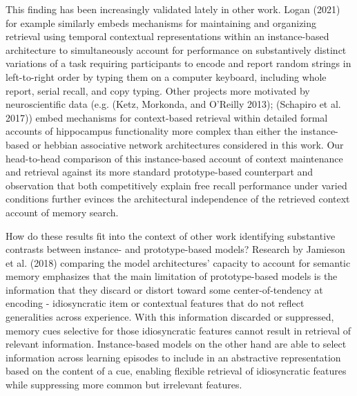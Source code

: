\documentclass[
  letterpaper,
  DIV=11]{article}
\begin{document}
This finding has been increasingly validated lately in other work. Logan
(2021) for example similarly embeds mechanisms for maintaining and
organizing retrieval using temporal contextual representations within an
instance-based architecture to simultaneously account for performance on
substantively distinct variations of a task requiring participants to
encode and report random strings in left-to-right order by typing them
on a computer keyboard, including whole report, serial recall, and copy
typing. Other projects more motivated by neuroscientific data (e.g.
(Ketz, Morkonda, and O'Reilly 2013); (Schapiro et al. 2017)) embed
mechanisms for context-based retrieval within detailed formal accounts
of hippocampus functionality more complex than either the instance-based
or hebbian associative network architectures considered in this work.
Our head-to-head comparison of this instance-based account of context
maintenance and retrieval against its more standard prototype-based
counterpart and observation that both competitively explain free recall
performance under varied conditions further evinces the architectural
independence of the retrieved context account of memory search.

How do these results fit into the context of other work identifying
substantive contrasts between instance- and prototype-based models?
Research by Jamieson et al. (2018) comparing the model architectures'
capacity to account for semantic memory emphasizes that the main
limitation of prototype-based models is the information that they
discard or distort toward some center-of-tendency at encoding -
idiosyncratic item or contextual features that do not reflect
generalities across experience. With this information discarded or
suppressed, memory cues selective for those idiosyncratic features
cannot result in retrieval of relevant information. Instance-based
models on the other hand are able to select information across learning
episodes to include in an abstractive representation based on the
content of a cue, enabling flexible retrieval of idiosyncratic features
while suppressing more common but irrelevant features.
\end{document}
